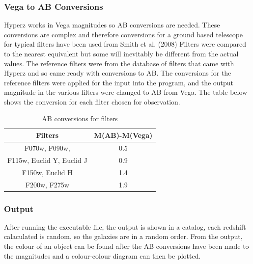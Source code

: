 		\subsubsection{Vega to AB Conversions} %
		\label{ssub:vega_to_ab_conversions}
			Hyperz works in Vega magnitudes so AB conversions are needed. These conversions are complex and therefore conversions for a ground based telescope for typical filters have been used from Smith et al. (2008) \cite{Graham} Filters were compared to the nearest equivalent but some will inevitably be different from the actual values. The reference filters were from the database of filters that came with Hyperz and so came ready with conversions to AB. The conversions for the reference filters were applied for the input into the program, and the output magnitude in the various filters were changed to AB from Vega. The table below shows the conversion for each filter chosen for observation.
			\begin{table}[ht]
				\begin{center}
					\begin{tabular}{c|c}
						Filters & M(AB)-M(Vega) \\
						\hline \hline
						F070w, F090w,  & 0.5 \\
						F115w, Euclid Y, Euclid J	& 0.9\\
						 F150w, Euclid H	& 1.4\\
						F200w, F275w & 1.9\\
					\end{tabular}
				\end{center}
				\caption{AB conversions for filters}
				\label{tab:AB_conversion}
			\end{table}

		\subsubsection{Output} %
		\label{ssub:output}
			After running the executable file, the output is shown in a catalog, each redshift calaculated is random, so the galaxies are in a random order. From the output, the colour of an object can be found after the AB conversions have been made to the magnitudes and a colour-colour diagram can then be plotted.

